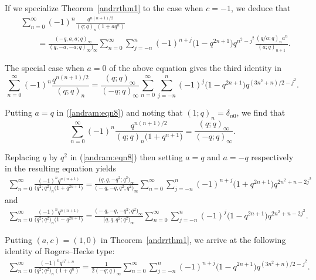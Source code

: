 \documentclass[10pt,a4paper]{amsart}
\numberwithin{equation}{section}
\begin{document}
If we specialize Theorem~\ref{andrrthm1} to the case when $c=-1$, we deduce that
\begin{align}
	&\sum_{n=0}^\infty (-1)^n \frac{q^{n(n+1)/2}}{(q; q)_n (1+aq^n)}\nonumber\\
	&\qquad{}=\frac{(-q, a, a; q)_\infty}{(q, -a, -a; q)_\infty)_\infty}\sum_{n=0}^\infty \sum_{j=-n}^n (-1)^{n+j} \bigl(1-q^{2n+1}\bigr) q^{n^2-j^2} \frac{(q/a; q)_n a^n}{(a; q)_{n+1}}.\label{andram:eqn8}
\end{align}

The special case when $a=0$ of the above equation gives the third identity in \cite[Proposition~1.11]{Liu2013IJTN}
\begin{equation*}%
	\sum_{n=0}^\infty (-1)^n\frac{q^{n(n+1)/2}}{(q; q)_n}
	=\frac{(q; q)_\infty}{(-q; q)_\infty}\sum_{n=0}^\infty \sum_{j=-n}^n (-1)^{j} \bigl(1-q^{2n+1}\bigr) q^{(3n^2+n)/2-j^2}.
\end{equation*}

Putting $a=q$ in (\ref{andram:eqn8}) and noting that $(1; q)_n=\delta_{n0}$, we find that
\begin{equation*}%
\sum_{n=0}^\infty (-1)^n \frac{q^{n(n+1)/2}}{(q; q)_n \bigl(1+q^{n+1}\bigr)}
=\frac{(q; q)_\infty}{(-q; q)_\infty}.
\end{equation*}

Replacing $q$ by $q^2$ in (\ref{andram:eqn8}) then setting $a=q$ and $a=-q$ respectively in the resulting equation yields
\begin{align*}%
	\sum_{n=0}^\infty \frac{(-1)^n q^{n(n+1)}}{\bigl(q^2; q^2\bigr)_n \bigl(1+q^{2n+1}\bigr)}
	=\frac{\bigl(q, q, -q^2; q^2\bigr)_\infty}{\bigl(-q, -q, q^2; q^2\bigr)_\infty}\sum_{n=0}^\infty \sum_{j=-n}^n (-1)^{n+j} \bigl(1+q^{2n+1}\bigr) q^{2n^2+n-2j^2}
\end{align*}
and
\begin{align*}%
\sum_{n=0}^\infty \frac{(-1)^n q^{n(n+1)}}{\bigl(q^2; q^2\bigr)_n \bigl(1-q^{2n+1}\bigr)}
=\frac{\bigl(-q, -q, -q^2; q^2\bigr)_\infty}{\bigl(q, q, q^2; q^2\bigr)_\infty}\sum_{n=0}^\infty \sum_{j=-n}^n (-1)^{j} \bigl(1-q^{2n+1}\bigr) q^{2n^2+n-2j^2}.
\end{align*}

Putting $(a, c)=(1, 0)$ in Theorem~\ref{andrrthm1}, we arrive at the following identity of Rogers--Hecke type:
\begin{align*}%
	\sum_{n=0}^\infty \frac{(-1)^n q^{n^2+n}}{\bigl(q^2; q^2\bigr)_n (1+q^n)}
	=\frac{1}{2(-q; q)_\infty}
	\sum_{n=0}^\infty \sum_{j=-n}^n(-1)^{n+j} \bigl(1-q^{2n+1}\bigr) q^{(3n^2+n)/2-j^2}.
\end{align*}
\end{document}
